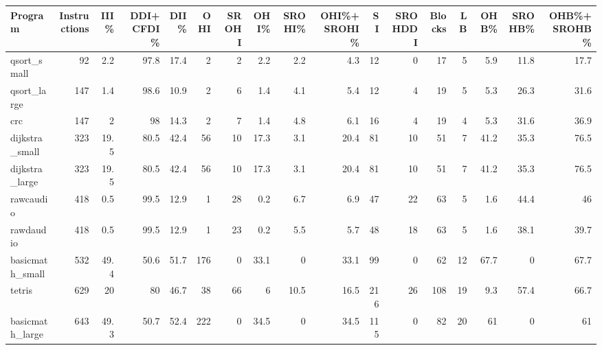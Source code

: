 \begin{tabular}{lrrrrrrrrrrrrrrrr}
\hline
 Program         &   Instructions &   III\% &   DDI+CFDI\% &   DII\% &   OHI &   SROHI &   OHI\% &   SROHI\% &   OHI\%+SROHI\% &   SI &   SROHDDI &   Blocks &   LB &   OHB\% &   SROHB\% &   OHB\%+SROHB\% \\
\hline
 qsort\_small     &             92 &    2.2 &        97.8 &   17.4 &     2 &       2 &    2.2 &      2.2 &           4.3 &   12 &         0 &       17 &    5 &    5.9 &     11.8 &          17.7 \\
 qsort\_large     &            147 &    1.4 &        98.6 &   10.9 &     2 &       6 &    1.4 &      4.1 &           5.4 &   12 &         4 &       19 &    5 &    5.3 &     26.3 &          31.6 \\
 crc             &            147 &    2   &        98   &   14.3 &     2 &       7 &    1.4 &      4.8 &           6.1 &   16 &         4 &       19 &    4 &    5.3 &     31.6 &          36.9 \\
 dijkstra\_small  &            323 &   19.5 &        80.5 &   42.4 &    56 &      10 &   17.3 &      3.1 &          20.4 &   81 &        10 &       51 &    7 &   41.2 &     35.3 &          76.5 \\
 dijkstra\_large  &            323 &   19.5 &        80.5 &   42.4 &    56 &      10 &   17.3 &      3.1 &          20.4 &   81 &        10 &       51 &    7 &   41.2 &     35.3 &          76.5 \\
 rawcaudio       &            418 &    0.5 &        99.5 &   12.9 &     1 &      28 &    0.2 &      6.7 &           6.9 &   47 &        22 &       63 &    5 &    1.6 &     44.4 &          46   \\
 rawdaudio       &            418 &    0.5 &        99.5 &   12.9 &     1 &      23 &    0.2 &      5.5 &           5.7 &   48 &        18 &       63 &    5 &    1.6 &     38.1 &          39.7 \\
 basicmath\_small &            532 &   49.4 &        50.6 &   51.7 &   176 &       0 &   33.1 &      0   &          33.1 &   99 &         0 &       62 &   12 &   67.7 &      0   &          67.7 \\
 tetris          &            629 &   20   &        80   &   46.7 &    38 &      66 &    6   &     10.5 &          16.5 &  216 &        26 &      108 &   19 &    9.3 &     57.4 &          66.7 \\
 basicmath\_large &            643 &   49.3 &        50.7 &   52.4 &   222 &       0 &   34.5 &      0   &          34.5 &  115 &         0 &       82 &   20 &   61   &      0   &          61   \\

\end{tabular}
